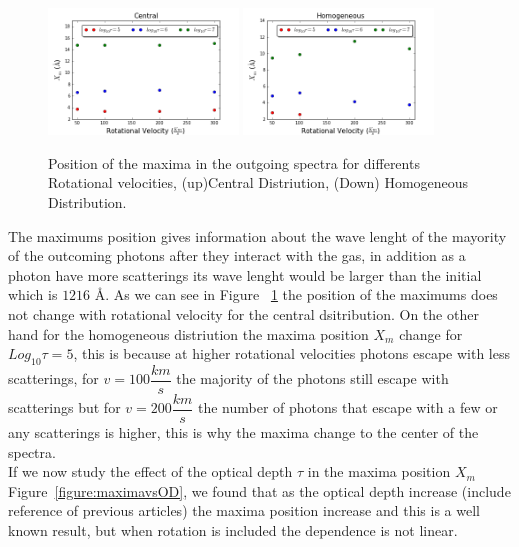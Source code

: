 \documentclass[usenatbib]{mn2e}
\begin{document}
\begin{figure}
    \includegraphics[width=0.45\textwidth]{maximumvsvelocitiesDifODCentral.png}
    \includegraphics[width=0.45\textwidth]{maximumvsvelocitiesDifODHOM.png}
  \label{figure:maximumsvsvelocities}\caption{Position of the maxima in the outgoing spectra for differents Rotational velocities, (up)Central Distriution, (Down) Homogeneous Distribution.}
\end{figure}

The maximums position gives information about the wave lenght of the
mayority of the outcoming photons after they interact with the gas, in
addition as a photon have more scatterings its wave lenght would be
larger than the initial which is $1216$ {\AA}. 
As we can see in Figure ~\ref{figure:maximumsvsvelocities} the position of the maximums does not change with rotational velocity for the central dsitribution. On the other hand for the homogeneous distriution the maxima position $X_{m}$ change for $Log_{10}\tau=5$, this is because at higher rotational velocities photons escape with less scatterings, for $v=100\dfrac{km}{s}$ the majority of the photons still escape with scatterings but for $v=200\dfrac{km}{s}$ the number of photons that escape with a few or any scatterings is higher, this is why the maxima change to the center of the spectra.\\

If we now study the effect of the optical depth $\tau$ in the maxima position $X_{m}$ Figure~\ref{figure:maximavsOD}, we found that as the optical depth increase (include reference of previous articles) the maxima position increase and this is a well known result, but when rotation is included the dependence is not linear.
\end{document}
